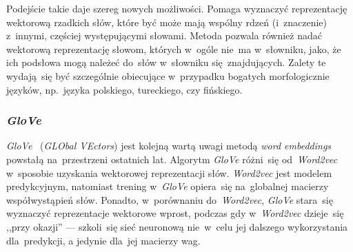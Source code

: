 \documentclass[pl]{minipw} %
\begin{document}
Podejście takie daje szereg nowych możliwości. Pomaga wyznaczyć reprezentację wektorową rzadkich słów, które być może mają wspólny rdzeń (i~znaczenie) z~innymi, częściej występującymi słowami. Metoda pozwala również nadać wektorową reprezentację słowom, których w~ogóle nie~ma w~słowniku, jako, że ich podsłowa mogą należeć do~słów w~słowniku się~znajdujących. Zalety te wydają~się być szczególnie obiecujące w~przypadku bogatych morfologicznie języków, np.~języka polskiego, tureckiego, czy fińskiego.  

\subsubsection{\textit{GloVe}}

\textit{GloVe}~\cite{glove} (\textit{GLObal VEctors}) jest kolejną wartą uwagi metodą \textit{word embeddings} powstałą na~przestrzeni ostatnich lat. Algorytm \textit{GloVe} różni~się od~\textit{Word2vec} w~sposobie uzyskania wektorowej reprezentacji słów. \textit{Word2vec} jest modelem predykcyjnym, natomiast trening w~\textit{GloVe} opiera~się na~globalnej macierzy współwystąpień słów. Ponadto, w~porównaniu do~\textit{Word2vec}, \textit{GloVe} stara~się wyznaczyć reprezentacje wektorowe wprost, podczas gdy w~\textit{Word2vec} dzieje~się ,,przy okazji'' --- szkoli~się sieć neuronową nie~w~celu jej dalszego wykorzystania dla~predykcji, a jedynie dla~jej macierzy wag. 
\end{document}
